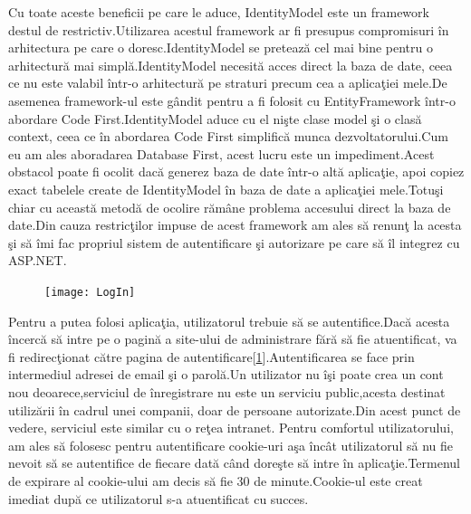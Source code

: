 \documentclass[a4paper,12pt]{report}
\let\oldref\ref
\renewcommand{\ref}[1]{[\oldref{#1}]}
\begin{document}
Cu toate aceste beneficii pe care le aduce, IdentityModel este un framework destul de restrictiv.Utilizarea acestul framework
ar fi presupus compromisuri \^in arhitectura pe care o doresc.IdentityModel se preteaz\u a cel mai bine pentru o arhitectur\u a
mai simpl\u a.IdentityModel necesit\u a acces direct la baza de date, ceea ce nu este valabil \^intr-o arhitectur\u a pe straturi
precum cea a aplica\c tiei mele.De asemenea framework-ul este g\^andit pentru a fi folosit cu EntityFramework \^intr-o abordare 
Code First.IdentityModel aduce cu el ni\c ste clase model \c si o clas\u a context, ceea ce \^in abordarea Code First simplific\u a
munca dezvoltatorului.Cum eu am ales aboradarea Database First, acest lucru este un impediment.Acest obstacol poate fi 
ocolit dac\u a generez baza de date \^intr-o alt\u a aplica\c tie, apoi copiez exact tabelele create de IdentityModel \^in 
baza de date a aplica\c tiei mele.Totu\c si chiar cu aceast\u a metod\u a de ocolire r\u am\^ane problema accesului direct
la baza de date.Din cauza restric\c tilor impuse de acest framework am ales s\u a renun\c t la acesta \c si s\u a \^imi fac 
propriul sistem de autentificare \c si autorizare pe care s\u a \^il integrez cu ASP.NET.

\begin{figure}[ht]
	\texttt{[image: LogIn]}
	\label{fig:LogIn}
\end{figure}
Pentru a putea folosi aplica\c tia, utilizatorul trebuie s\u a se autentifice.Dac\u a acesta \^incerc\u a s\u a intre pe o pagin\u a a site-ului
de administrare f\u ar\u a s\u a fie atuentificat, va fi redirec\c tionat c\u atre pagina de autentificare\ref{fig:LogIn}.Autentificarea se face prin 
intermediul adresei de email \c si o parol\u a.Un utilizator nu \^i\c si poate crea un cont nou deoarece,serviciul 
de \^inregistrare nu este un serviciu public,acesta destinat utiliz\u arii \^in cadrul unei companii, doar de 
persoane autorizate.Din acest punct de vedere, serviciul este similar cu o re\c tea intranet.
Pentru comfortul utilizatorului, am ales s\u a folosesc pentru autentificare cookie-uri a\c sa \^inc\^at
utilizatorul s\u a nu fie nevoit s\u a se autentifice de fiecare dat\u a c\^and dore\c ste s\u a intre \^in
aplica\c tie.Termenul de expirare al cookie-ului am decis s\u a fie 30 de minute.Cookie-ul este creat imediat dup\u a ce 
utilizatorul s-a atuentificat cu succes.
\end{document}
